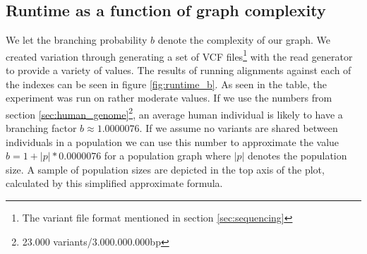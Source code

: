 \documentclass[thesis.tex]{subfiles}
\begin{document}
\subsection*{Runtime as a function of graph complexity}
\label{sec:runtime_complexity}
We let the branching probability $b$ denote the complexity of our graph. We created variation through generating a set of VCF files\footnote{The variant file format mentioned in section \ref{sec:sequencing} } with the read generator to provide a variety of values. The results of running alignments against each of the indexes can be seen in figure \ref{fig:runtime_b}. As seen in the table, the experiment was run on rather moderate values. If we use the numbers from section \ref{sec:human_genome}\footnote{23.000 variants/3.000.000.000bp}, an average human individual is likely to have a branching factor $b\approx1.0000076$. If we assume no variants are shared between individuals in a population we can use this number to approximate the value $b=1+|p|*0.0000076$ for a population graph where $|p|$ denotes the population size. A sample of population sizes are depicted in the top axis of the plot, calculated by this simplified approximate formula.
\end{document}
